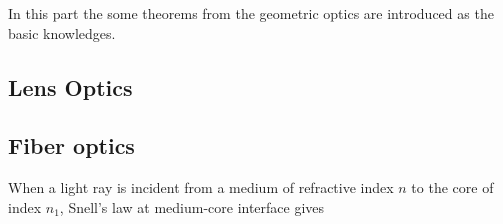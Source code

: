 In this part the  some theorems from the geometric optics  are introduced as the basic knowledges.

\subsection{Lens Optics}


\subsection{Fiber optics}
When a light ray is incident from a medium of refractive index $n$ to the core of index $n_{1}$, Snell's law at medium-core interface gives